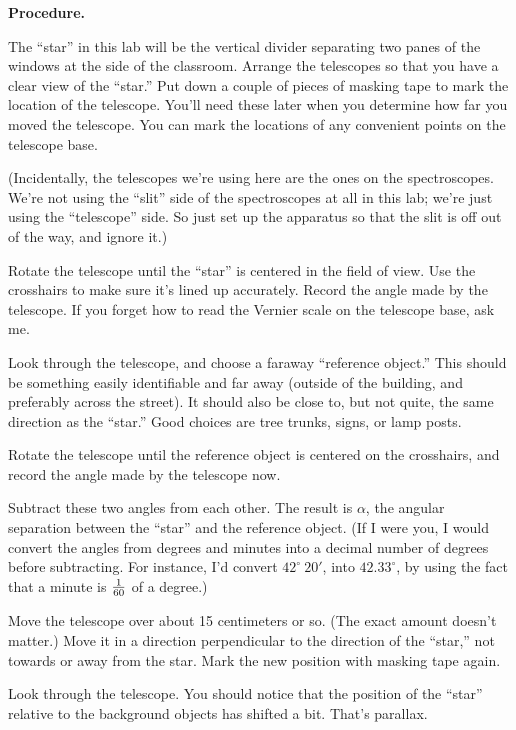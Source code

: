 \bigskip

{\bf Procedure.}

The ``star'' in this lab will be the vertical divider separating
two panes of the windows at the side of the classroom.  Arrange
the telescopes so that you have a clear view of the ``star.''
Put down a couple of pieces of masking tape to mark the location
of the telescope.  You'll need these later when you determine
how far you moved the telescope.  You can mark the locations
of any convenient points on the telescope base.

(Incidentally, the telescopes we're using here are the ones on the
spectroscopes.  We're not using the ``slit'' side of the spectroscopes
at all in this lab; we're just using the ``telescope'' side.  So 
just set up the apparatus so that the slit is off out of the way, and
ignore it.)

Rotate the telescope until the ``star'' is centered in the field of view.
Use the crosshairs to make sure it's lined up accurately.
Record the angle made by the telescope.  If you forget how to read
the Vernier scale on the telescope base, ask me.

\vskip 1in

Look through the telescope, and choose a faraway ``reference object.''
This should be something easily identifiable and far away (outside
of the building, and preferably across the street).  It should also
be close to, but not quite, the same direction as the ``star.''
Good choices are tree trunks, signs, or lamp posts.

Rotate the telescope until the reference object is centered on the crosshairs,
and record the angle made by the telescope now.

\vskip 1in

Subtract these two angles from each other.  The result is $\alpha$,
the angular separation between the ``star'' and the reference
object.  (If I were you, I would convert the angles from degrees
and minutes into a decimal number of degrees before subtracting.
For instance, I'd convert $42^\circ\ 20'$, into $42.33^\circ$,
by using the fact that a minute is $1\over 60$ of a degree.)

\vskip 1in

Move the telescope over about 15 centimeters or so.  (The exact amount
doesn't matter.)  Move it in a direction perpendicular to the direction
of the ``star,'' not towards or away from the star.
Mark the new position with masking tape again.

Look through the telescope.  You should notice that the position
of the ``star'' relative to the background objects has shifted
a bit.  That's parallax.

